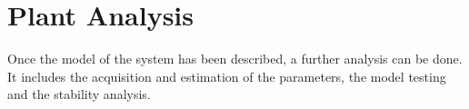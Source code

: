 \chapter{Plant Analysis}

Once the model of the system has been described, a further analysis can be done. It includes the acquisition and estimation of the parameters, the model testing and the stability analysis.
